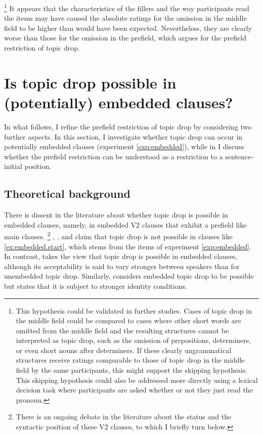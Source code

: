 \footnote{This hypothesis could be validated in further studies.
Cases of topic drop in the middle field could be compared to cases where other short words are omitted from the middle field and the resulting structures cannot be interpreted as topic drop, such as the omission of prepositions, determiners,  or even short nouns after determiners.
If these clearly ungrammatical structures receive ratings comparable to those of topic drop in the middle field by the same participants, this might support the skipping hypothesis.
This skipping hypothesis could also be addressed more directly using a lexical decision task where participants are asked whether or not they just read the pronoun.
}
%
It appears that the characteristics of the fillers and the way participants read the items may have caused the absolute ratings for the omission in the middle field to be higher than would have been expected.
Nevertheless, they are clearly worse than those for the omission in the prefield, which argues for the prefield restriction of topic drop.  

\section{Is topic drop possible in (potentially) embedded clauses?}\label{sec:highest} 
In what follows, I refine the prefield restriction of topic drop by considering two further aspects.
In this section, I investigate whether topic drop can occur in potentially embedded clauses (experiment \ref*{exp:embedded}), while in  I discuss whether the prefield restriction can be understood as a restriction to a sentence-initial position.

\subsection{Theoretical background}\label{sec:highest.theory}
There is dissent in the literature about whether topic drop is possible in embedded clauses, namely,
in embedded V2 clauses that exhibit a prefield like main clauses.%
\footnote{There is an ongoing debate in the literature about the status and the syntactic position of these V2 clauses, to which I briefly turn below.}
%
\citet[76]{cardinaletti1990}, \citet[169]{rizzi1994}, and \citet[272]{volodina2011} claim that topic drop is not possible in clauses like \ref{ex:embedded.start}, which stems from the items of experiment \ref*{exp:embedded}.
In contrast, \citet[101]{jaensch2005} takes the view that topic drop is possible in embedded clauses, although its acceptability is said to vary stronger between speakers than for unembedded topic drop.
Similarly, \citet[224--225]{trutkowski2016} considers embedded topic drop to be possible but states that it is subject to stronger identity conditions.

